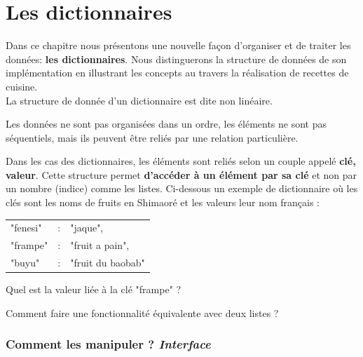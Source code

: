 \renewcommand{\chaptername}{\phantom{Chapitre}}\renewcommand{\thechapter}{}
\chapter{Les dictionnaires}
\renewcommand{\thesection}{\arabic{section}}
Dans ce chapitre nous présentons une nouvelle façon d'organiser et de traiter les données: \textbf{les dictionnaires}. Nous distinguerons la structure de données de son implémentation en illustrant les concepts au travers la réalisation de recettes de cuisine.\\[-0.5cm]

 La structure de donnée d'un dictionnaire est dite non linéaire.
\begin{tcolorbox}[enhanced,
    colback=green!25!black!10!white,colframe=green!75!black,title=Structures non linéaires,
    drop fuzzy shadow,watermark color=white]
Les données ne sont pas organisées dans un ordre, les éléments ne sont pas séquentiels, mais ils peuvent être reliés par une relation particulière.
  \end{tcolorbox}
Dans les cas des dictionnaires, les éléments sont reliés selon un couple appelé \textbf{clé, valeur}. Cette structure permet \textbf{d'accéder à un élément par sa clé} et non par un nombre (indice) comme les listes. Ci-dessous un exemple de dictionnaire où les clés sont les noms de fruits en Shimaoré et les valeurs leur nom français :
\begin{center}
    \noindent\begin{tabular}{l c l }
    "fenesi" &:& "jaque",\\
    "frampe" &:& "fruit a pain",\\
    "buyu" &:& "fruit du baobab"\\
    \end{tabular}
\end{center}
\vspace{0.5cm}
%
Quel est la valeur liée à la clé "frampe" ?
\vspace{0.5cm}

\noindent Comment faire une fonctionnalité équivalente avec deux listes ?
\vspace{2.3cm}


\subsection*{Comment les manipuler ? \textit{Interface}}

